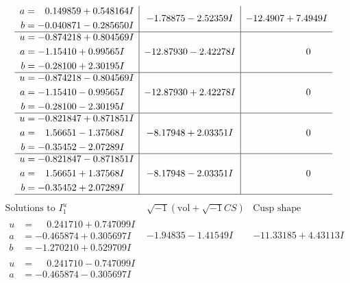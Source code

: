 \documentclass[1p]{elsarticle_modified}
\theoremstyle{definition}
\newcommand{\I}{\sqrt{-1}}
\begin{document}
$$\begin{array}{c|c|c}
\begin{aligned}
a &= \phantom{-}0.149859 + 0.548164 I \\
b &= -0.040871 - 0.285650 I\end{aligned}
 & -1.78875 - 2.52359 I & -12.4907 + 7.4949 I \\ \hline\begin{aligned}
u &= -0.874218 + 0.804569 I \\
a &= -1.15410 + 0.99565 I \\
b &= -0.28100 + 2.30195 I\end{aligned}
 & -12.87930 - 2.42278 I & \phantom{-0.000000 } 0 \\ \hline\begin{aligned}
u &= -0.874218 - 0.804569 I \\
a &= -1.15410 - 0.99565 I \\
b &= -0.28100 - 2.30195 I\end{aligned}
 & -12.87930 + 2.42278 I & \phantom{-0.000000 } 0 \\ \hline\begin{aligned}
u &= -0.821847 + 0.871851 I \\
a &= \phantom{-}1.56651 - 1.37568 I \\
b &= -0.35452 - 2.07289 I\end{aligned}
 & -8.17948 + 2.03351 I & \phantom{-0.000000 } 0 \\ \hline\begin{aligned}
u &= -0.821847 - 0.871851 I \\
a &= \phantom{-}1.56651 + 1.37568 I \\
b &= -0.35452 + 2.07289 I\end{aligned}
 & -8.17948 - 2.03351 I & \phantom{-0.000000 } 0\\
 \hline 
 \end{array}$$\newpage$$\begin{array}{c|c|c}  
\text{Solutions to }I^u_{1}& \I (\text{vol} + \sqrt{-1}CS) & \text{Cusp shape}\\
 \hline 
\begin{aligned}
u &= \phantom{-}0.241710 + 0.747099 I \\
a &= -0.465874 + 0.305697 I \\
b &= -1.270210 + 0.529709 I\end{aligned}
 & -1.94835 - 1.41549 I & -11.33185 + 4.43113 I \\ \hline\begin{aligned}
u &= \phantom{-}0.241710 - 0.747099 I \\
a &= -0.465874 - 0.305697 I \\

\end{aligned}
\end{array}$$
\end{document}
